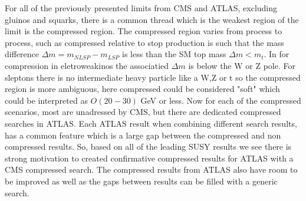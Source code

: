 

For all of the previously presented limits from CMS and ATLAS, excluding gluinos and squarks, there is a common thread which is the weakest region of the limit is the compressed region. The compressed region varies from process to process, such as compressed relative to stop production is such that the mass difference $\Delta m = m_{NLSP} - m_{LSP}$ is less than the SM top mass $\Delta m < m_t$. In for compression in eletroweakinos the associatied $\Delta m$ is below the W or Z pole. For sleptons there is no intermediate heavy particle like a W,Z or t so the compressed region is more ambiguous, here compressed could be considered "soft" which could be interpreted as $O(20-30)$ GeV or less. Now for each of the compressed scenarios, most are unadressed by CMS, but there are dedicated compressed searches in ATLAS. Each ATLAS result when combining different search results, has a common feature which is a large gap between the compressed and non compressed results. So, based on all of the leading SUSY results we see there is strong motivation to created confirmative compressed results for ATLAS with a CMS compressed search. The compressed results from ATLAS also have room to be improved as well as the gaps between results can be filled with a generic search. 

